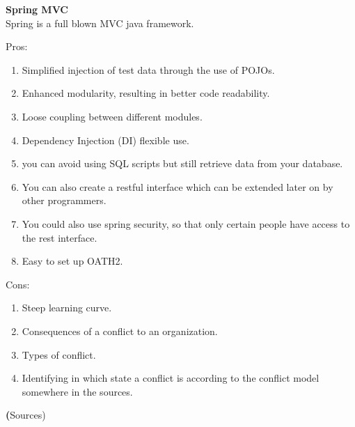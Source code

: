 \textbf{Spring MVC} \\
Spring is a full blown MVC java framework.

Pros:
\begin{enumerate}
	\item Simplified injection of test data through the use of POJOs.
	\item Enhanced modularity, resulting in better code readability.
	\item Loose coupling between different modules.
	\item Dependency Injection (DI) flexible use.
	\item you can avoid using SQL scripts but still retrieve data from your database.
	\item You can also create a restful interface which can be extended later on by other programmers.
	\item You could also use spring security, so that only certain people have access to the rest interface.
	\item Easy to set up OATH2. 
\end{enumerate}
Cons:
\begin{enumerate}
	\item Steep learning curve.
	\item Consequences of a conflict to an organization.
	\item Types of conflict.
	\item Identifying in which state a conflict is according to the conflict model somewhere in the sources.
\end{enumerate}

\textbf(Sources)\\
